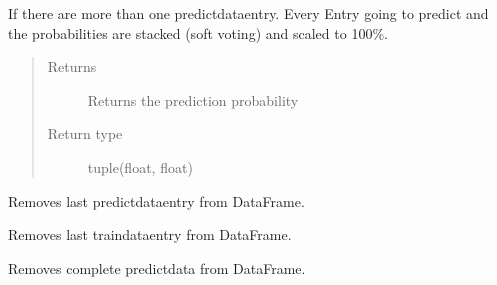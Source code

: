 \documentclass[letterpaper,10pt,english]{sphinxmanual}
\begin{document}
\begin{fulllineitems}
\begin{fulllineitems}
\sphinxAtStartPar
If there are more than one predict\sphinxhyphen{}data\sphinxhyphen{}entry. Every Entry going to predict
and the probabilities are stacked (soft voting) and scaled to 100\%.
\begin{quote}\begin{description}
\item[{Returns}] \leavevmode
\sphinxAtStartPar
Returns the prediction probability

\item[{Return type}] \leavevmode
\sphinxAtStartPar
tuple(float, float)

\end{description}\end{quote}

\end{fulllineitems}


\begin{fulllineitems}
\label{\detokenize{anoog.automation:anoog.automation.ai_model.AI_Model.remove_last_predict_dataset}}
\sphinxAtStartPar
Removes last predict\sphinxhyphen{}data\sphinxhyphen{}entry from DataFrame.

\end{fulllineitems}


\begin{fulllineitems}
\label{\detokenize{anoog.automation:anoog.automation.ai_model.AI_Model.remove_last_train_dataset}}
\sphinxAtStartPar
Removes last train\sphinxhyphen{}data\sphinxhyphen{}entry from DataFrame.

\end{fulllineitems}


\begin{fulllineitems}
\label{\detokenize{anoog.automation:anoog.automation.ai_model.AI_Model.remove_predict_dataset}}
\sphinxAtStartPar
Removes complete predict\sphinxhyphen{}data from DataFrame.


\end{fulllineitems}
\end{fulllineitems}
\end{document}

